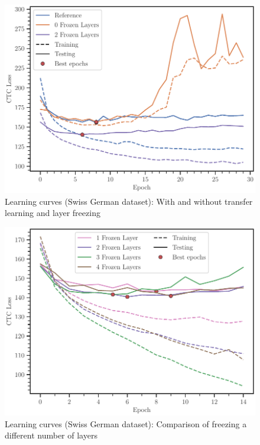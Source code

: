 \documentclass[11pt]{article}
\begin{document}
\begin{figure}[htbp]
    \centering
    \includegraphics{3curves_ch.pdf}
    \caption{Learning curves (Swiss German dataset): With and without transfer learning and layer freezing}
    \label{fig:3ch}
\end{figure}

\begin{figure}[htbp]
    \centering
    \includegraphics{4curves_ch.pdf}
    \caption{Learning curves (Swiss German dataset): Comparison of freezing a different number of layers}
    \label{fig:4ch}
\end{figure}
\end{document}
